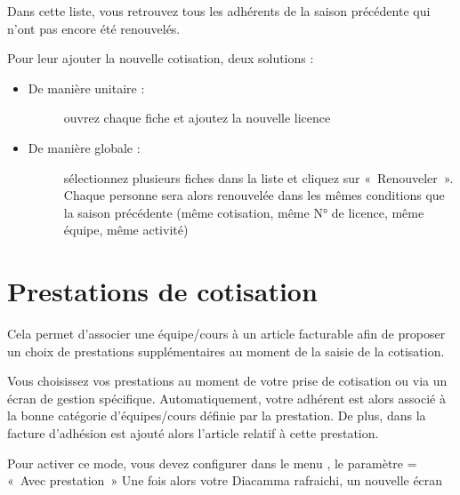 \documentclass[a4paper,10pt,oneside,french]{sphinxmanual}
\begin{document}
\sphinxAtStartPar
Dans cette liste, vous retrouvez tous les adhérents de la saison précédente qui n’ont pas encore été renouvelés.

\sphinxAtStartPar
Pour leur ajouter la nouvelle cotisation, deux solutions :
\begin{itemize}
\item {} \begin{description}
\item[{De manière unitaire :}] \leavevmode
\sphinxAtStartPar
ouvrez chaque fiche et ajoutez la nouvelle licence

\end{description}

\item {} \begin{description}
\item[{De manière globale :}] \leavevmode
\sphinxAtStartPar
sélectionnez plusieurs fiches dans la liste et cliquez sur « Renouveler ». Chaque personne sera alors renouvelée dans les mêmes conditions que la saison précédente (même cotisation, même N° de licence, même équipe, même activité)

\end{description}

\end{itemize}


\section{Prestations de cotisation}
\label{\detokenize{member/prestation:prestations-de-cotisation}}\label{\detokenize{member/prestation::doc}}
\sphinxAtStartPar
Cela permet d’associer une équipe/cours à un article facturable afin de proposer un choix de prestations supplémentaires au moment de la saisie de la cotisation.

\sphinxAtStartPar
Vous choisissez vos prestations au moment de votre prise de cotisation ou via un écran de gestion spécifique.
Automatiquement, votre adhérent est alors associé à la bonne catégorie d’équipes/cours définie par la prestation.
De plus, dans la facture d’adhésion est ajouté alors l’article relatif à cette prestation.

\sphinxAtStartPar
Pour activer ce mode, vous devez configurer dans le menu , le paramètre  = « Avec prestation »
Une fois alors votre Diacamma rafraichi, un nouvelle écran 
\begin{quote}

\noindent{}
\end{quote}
\end{document}
